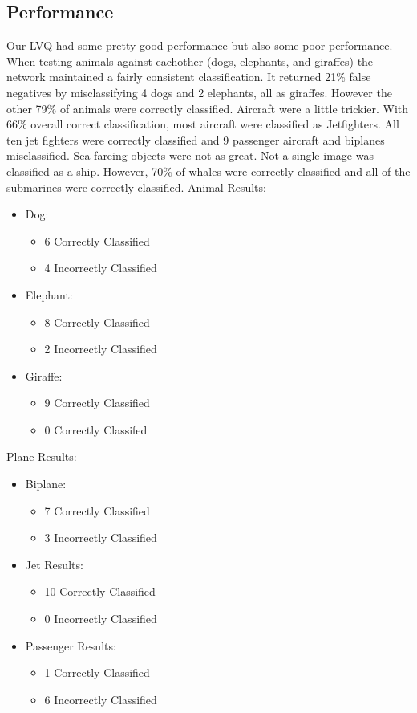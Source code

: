 \documentclass{article}
\begin{document}
\subsection{Performance}
Our LVQ had some pretty good performance but also some poor performance.  When testing animals against eachother (dogs, elephants, and giraffes) the network maintained a fairly consistent classification.  It returned 21\% false negatives by misclassifying 4 dogs and 2 elephants, all as giraffes.  However the other 79\% of animals were correctly classified.  Aircraft were a little trickier.  With 66\% overall correct classification, most aircraft were classified as Jetfighters. All ten jet fighters were correctly classified and 9 passenger aircraft and biplanes misclassified.  Sea-fareing objects were not as great.  Not a single image was classified as a ship.  However, 70\% of whales were correctly classified and all of the submarines were correctly classified.
Animal Results:
\begin{itemize}
    \item Dog:
    \begin{itemize}
        \item 6 Correctly Classified
        \item 4 Incorrectly Classified
        \end{itemize}
    \item Elephant:
    \begin{itemize}
        \item 8 Correctly Classified
        \item 2 Incorrectly Classified
        \end{itemize}
   \item Giraffe:
   \begin{itemize}
        \item 9 Correctly Classified
        \item 0 Correctly Classifed
        \end{itemize}
\end{itemize}
Plane Results:
\begin{itemize}
    \item Biplane:
    \begin{itemize}
        \item 7 Correctly Classified
        \item 3 Incorrectly Classified
        \end{itemize}
    \item Jet Results:
    \begin{itemize}
        \item 10 Correctly Classified
        \item 0 Incorrectly Classified
        \end{itemize}
    \item Passenger Results:
    \begin{itemize}
        \item 1 Correctly Classified
        \item 6 Incorrectly Classified
        \end{itemize}
\end{itemize}
\end{document}
